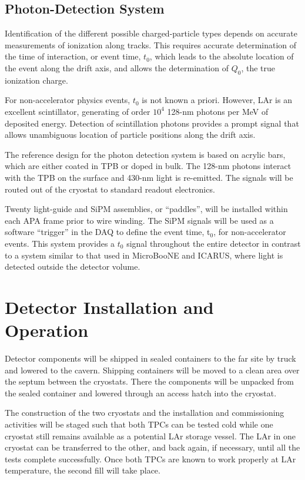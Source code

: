 \subsection{Photon-Detection System}

Identification of the different possible charged-particle types depends on accurate measurements of ionization along tracks. This requires accurate determination of the time of interaction, or event time, $t_0$, which leads to the absolute location of the event along the drift axis, and allows the determination of $Q_0$,  the 
true ionization charge.

For non-accelerator physics events, $t_0$ is not known a priori. However, LAr is an excellent scintillator, generating of order $10^{4}$ 128-nm photons per MeV of deposited energy.  Detection of scintillation photons provides a prompt signal that allows unambiguous location of particle positions along the drift axis.

The reference design for the photon detection system is based on acrylic bars, which are either coated in TPB or doped in bulk. The 128-nm photons interact with the TPB on the surface and 430-nm light is re-emitted. The signals will be routed out of the cryostat to standard readout electronics.

Twenty light-guide and SiPM assemblies, or ``paddles'', will be installed within each APA frame prior to wire winding. The SiPM signals will be used as a software ``trigger'' in the DAQ to define the event time, t$_0$, for non-accelerator events. This system provides a $t_0$ signal throughout the entire detector in contrast to a system similar to that used in MicroBooNE and ICARUS, where light is detected outside the detector volume. 

\section{Detector Installation and Operation}
\label{sec:det-install}

Detector components will be shipped in sealed containers to the far site by truck and lowered to the cavern. Shipping containers will be moved to a clean area over the septum between the cryostats. There the components will be unpacked from the sealed container and lowered  through an access hatch into the cryostat. 

The construction of the two cryostats and the installation and commissioning activities will be staged such that both TPCs can be tested cold while one cryostat still remains available as a potential LAr storage vessel. The LAr in one cryostat can be transferred to the other, and back again, if necessary, until all the tests complete successfully. Once both TPCs are known to work properly at LAr temperature, the second fill will take place.

